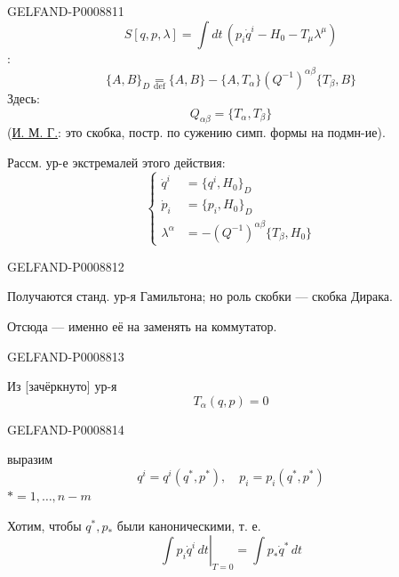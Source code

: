 \begin{GelfandAdjacentEvidence}{GELFAND-P000881}{1}
\begin{equation*}
S[q,p,\lambda]=\int dt\,(p_i\dot q^i-H_0-T_\mu\lambda^\mu)
\tag{11}
\end{equation*}
:
\begin{equation*}
\{A,B\}_D\underset{\mathrm{def}}{=}
\{A,B\}-\{A,T_\alpha\}(Q^{-1})^{\alpha\beta}\{T_\beta,B\}
\tag{12}
\end{equation*}
Здесь:
\begin{equation*}
Q_{\alpha\beta}=\{T_\alpha,T_\beta\}
\tag{13}
\end{equation*}
(\uline{И. М. Г.}: это скобка, постр. по сужению симп. формы на подмн-ие).

Рассм. ур-е экстремалей этого действия:
\begin{equation*}
\left\{\begin{aligned}
\dot q^i&=\{q^i,H_0\}_D\\
\dot p_i&=\{p_i,H_0\}_D\\
\lambda^\alpha&=-(Q^{-1})^{\alpha\beta}\{T_\beta,H_0\}
\end{aligned}\right.
\tag{14}
\end{equation*}
\end{GelfandAdjacentEvidence}
\begin{GelfandAdjacentEvidence}{GELFAND-P000881}{2}


Получаются станд. ур-я Гамильтона;
но роль скобки --- скобка Дирака.

Отсюда --- именно её на заменять на коммутатор.
\end{GelfandAdjacentEvidence}
\begin{GelfandAdjacentEvidence}{GELFAND-P000881}{3}


Из [зачёркнуто] ур-я
\begin{equation*}
T_\alpha(q,p)=0
\tag{15}
\end{equation*}
\end{GelfandAdjacentEvidence}
\begin{GelfandAdjacentEvidence}{GELFAND-P000881}{4}


выразим
\begin{equation*}
q^i=q^i(q^*,p^*),\quad p_i=p_i(q^*,p^*)
\tag{16}
\end{equation*}
$*=1,\ldots,n-m$

Хотим, чтобы $q^*,p_*$ были каноническими, т. е.
\begin{equation*}
\left.\int p_i\dot q^i\,dt\right|_{T=0}=\int p_*\dot q^*\,dt
\tag{17}
\end{equation*}
\end{GelfandAdjacentEvidence}
